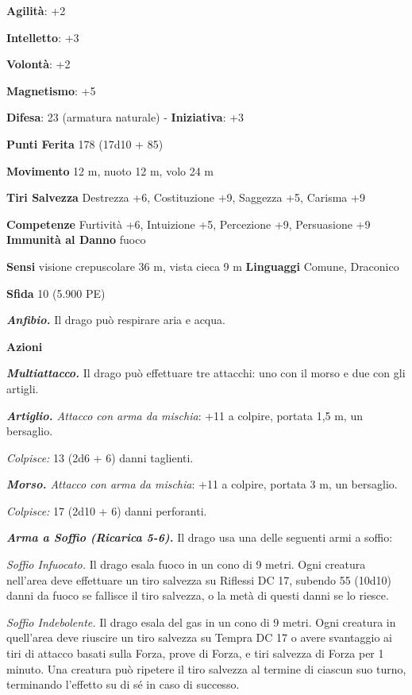 \begin{multicols}{2}
\textbf{Agilità}: +2

\textbf{Intelletto}: +3

\textbf{Volontà}: +2

\textbf{Magnetismo}: +5

\textbf{Difesa}: 23 (armatura naturale) - \textbf{Iniziativa}: +3

\textbf{Punti Ferita} 178 (17d10 + 85)

\textbf{Movimento} 12 m, nuoto 12 m, volo 24 m

\textbf{Tiri Salvezza} Destrezza +6, Costituzione +9, Saggezza +5,
Carisma +9

\textbf{Competenze} Furtività +6, Intuizione +5, Percezione +9, Persuasione
+9 \textbf{Immunità al Danno} fuoco

\textbf{Sensi} visione crepuscolare 36 m, vista cieca 9 m
\textbf{Linguaggi} Comune, Draconico

\textbf{Sfida} 10 (5.900 PE)

\emph{\textbf{Anfibio.}} Il drago può respirare aria e acqua.

\textbf{Azioni}

\emph{\textbf{Multiattacco.}} Il drago può effettuare tre attacchi: uno
con il morso e due con gli artigli.

\emph{\textbf{Artiglio.} Attacco con arma da mischia}: +11 a colpire,
portata 1,5 m, un bersaglio.

\emph{Colpisce:} 13 (2d6 + 6) danni taglienti.

\emph{\textbf{Morso.} Attacco con arma da mischia}: +11 a colpire,
portata 3 m, un bersaglio.

\emph{Colpisce:} 17 (2d10 + 6) danni perforanti.

\emph{\textbf{Arma a Soffio (Ricarica 5-6).}} Il drago usa una delle
seguenti armi a soffio:

\emph{Soffio Infuocato.} Il drago esala fuoco in un cono di 9 metri.
Ogni creatura nell'area deve effettuare un tiro salvezza su Riflessi DC
17, subendo 55 (10d10) danni da fuoco se fallisce il tiro salvezza, o la
metà di questi danni se lo riesce.

\emph{Soffio Indebolente.} Il drago esala del gas in un cono di 9 metri.
Ogni creatura in quell'area deve riuscire un tiro salvezza su Tempra DC
17 o avere svantaggio ai tiri di attacco basati sulla Forza, prove di
Forza, e tiri salvezza di Forza per 1 minuto. Una creatura può ripetere
il tiro salvezza al termine di ciascun suo turno, terminando l'effetto
su di sé in caso di successo.


\end{multicols}
